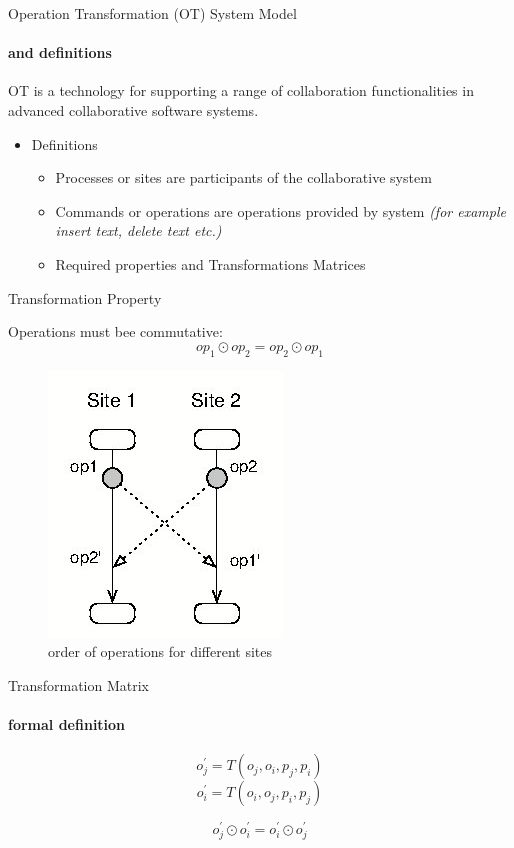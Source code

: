 \documentclass{beamer}
\begin{document}
\begin{frame}{Operation Transformation (OT) System Model}
\framesubtitle{and definitions}

\begin{block}{OT}
is a technology for supporting a range of collaboration functionalities in advanced collaborative software systems.	
\end{block}
\vspace{0.5cm}
\begin{itemize}
	
  \item Definitions
  \begin{itemize}
    \item Processes or sites are participants of the collaborative system
    \item Commands or operations are operations provided by system \textit{(for example insert text, delete text etc.)}
    \item Required properties and Transformations Matrices
  \end{itemize}     
\end{itemize}
\end{frame}

\begin{frame}{Transformation Property}

Operations must bee commutative:
\[op_1 \odot op_2 = op_2 \odot op_1\]

\begin{figure}
	\includegraphics[scale=0.5]{OT-Operations-Order.jpg}
	\caption{order of operations for different sites}
\end{figure}

\end{frame}


\begin{frame}{Transformation Matrix}
\framesubtitle{formal definition}

\[o_{j}^{'} = T(o_j, o_i, p_j, p_i)\]
\[o_{i}^{'} = T(o_i, o_j, p_i, p_j)\]

\[o_{j}^{'} \odot o_{i}^{'} = o_{i}^{'} \odot o_{j}^{'}\]


\end{frame}
\end{document}
